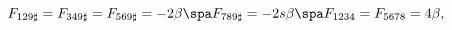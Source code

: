 \begin{equation}
\label{fluxn4M1}
F_{129\sharp} = F_{349\sharp} = F_{569\sharp} = - 2\beta
\spa
F_{789\sharp} = - 2 s \beta 
\spa
F_{1234} = F_{5678} = 4 \beta,
\end{equation}


